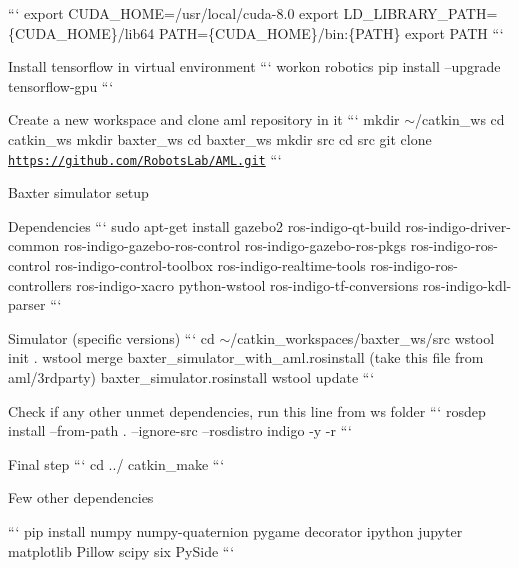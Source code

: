 \begin{DoxyEnumerate}
\begin{DoxyItemize}
``` export C\-U\-D\-A\-\_\-\-H\-O\-M\-E=/usr/local/cuda-\/8.0 export L\-D\-\_\-\-L\-I\-B\-R\-A\-R\-Y\-\_\-\-P\-A\-T\-H=\{C\-U\-D\-A\-\_\-\-H\-O\-M\-E\}/lib64 P\-A\-T\-H=\{C\-U\-D\-A\-\_\-\-H\-O\-M\-E\}/bin\-:\{P\-A\-T\-H\} export P\-A\-T\-H ```
\end{DoxyItemize}
\item Install tensorflow in virtual environment ``` workon robotics pip install --upgrade tensorflow-\/gpu ```
\item Create a new workspace and clone aml repository in it ``` mkdir $\sim$/catkin\-\_\-ws cd catkin\-\_\-ws mkdir baxter\-\_\-ws cd baxter\-\_\-ws mkdir src cd src git clone \href{https://github.com/RobotsLab/AML.git}{\tt https\-://github.\-com/\-Robots\-Lab/\-A\-M\-L.\-git} ```
\item Baxter simulator setup
\begin{DoxyItemize}
\item Dependencies ``` sudo apt-\/get install gazebo2 ros-\/indigo-\/qt-\/build ros-\/indigo-\/driver-\/common ros-\/indigo-\/gazebo-\/ros-\/control ros-\/indigo-\/gazebo-\/ros-\/pkgs ros-\/indigo-\/ros-\/control ros-\/indigo-\/control-\/toolbox ros-\/indigo-\/realtime-\/tools ros-\/indigo-\/ros-\/controllers ros-\/indigo-\/xacro python-\/wstool ros-\/indigo-\/tf-\/conversions ros-\/indigo-\/kdl-\/parser ```
\item Simulator (specific versions) ``` cd $\sim$/catkin\-\_\-workspaces/baxter\-\_\-ws/src wstool init . wstool merge baxter\-\_\-simulator\-\_\-with\-\_\-aml.\-rosinstall (take this file from aml/3rdparty) baxter\-\_\-simulator.\-rosinstall wstool update ```
\end{DoxyItemize}
\end{DoxyEnumerate}

Check if any other unmet dependencies, run this line from ws folder ``` rosdep install --from-\/path . --ignore-\/src --rosdistro indigo -\/y -\/r ```


\begin{DoxyItemize}
\item Final step ``` cd ../ catkin\-\_\-make ```
\end{DoxyItemize}

Few other dependencies

``` pip install numpy numpy-\/quaternion pygame decorator ipython jupyter matplotlib Pillow scipy six Py\-Side ```


